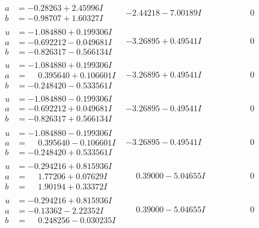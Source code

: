 \documentclass[1p]{elsarticle_modified}
\theoremstyle{definition}
\begin{document}
$$\begin{array}{c|c|c}
\begin{aligned}
a &= -0.28263 + 2.45996 I \\
b &= -0.98707 + 1.60327 I\end{aligned}
 & -2.44218 - 7.00189 I & \phantom{-0.000000 } 0 \\ \hline\begin{aligned}
u &= -1.084880 + 0.199306 I \\
a &= -0.692212 - 0.049681 I \\
b &= -0.826317 - 0.566134 I\end{aligned}
 & -3.26895 + 0.49541 I & \phantom{-0.000000 } 0 \\ \hline\begin{aligned}
u &= -1.084880 + 0.199306 I \\
a &= \phantom{-}0.395640 + 0.106601 I \\
b &= -0.248420 - 0.533561 I\end{aligned}
 & -3.26895 + 0.49541 I & \phantom{-0.000000 } 0 \\ \hline\begin{aligned}
u &= -1.084880 - 0.199306 I \\
a &= -0.692212 + 0.049681 I \\
b &= -0.826317 + 0.566134 I\end{aligned}
 & -3.26895 - 0.49541 I & \phantom{-0.000000 } 0 \\ \hline\begin{aligned}
u &= -1.084880 - 0.199306 I \\
a &= \phantom{-}0.395640 - 0.106601 I \\
b &= -0.248420 + 0.533561 I\end{aligned}
 & -3.26895 - 0.49541 I & \phantom{-0.000000 } 0 \\ \hline\begin{aligned}
u &= -0.294216 + 0.815936 I \\
a &= \phantom{-}1.77206 + 0.07629 I \\
b &= \phantom{-}1.90194 + 0.33372 I\end{aligned}
 & \phantom{-}0.39000 - 5.04655 I & \phantom{-0.000000 } 0 \\ \hline\begin{aligned}
u &= -0.294216 + 0.815936 I \\
a &= -0.13362 - 2.22352 I \\
b &= \phantom{-}0.248256 - 0.030235 I\end{aligned}
 & \phantom{-}0.39000 - 5.04655 I & \phantom{-0.000000 } 0 \\ \hline\begin{aligned}

\end{aligned}
\end{array}$$
\end{document}
